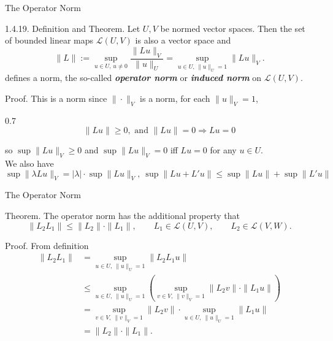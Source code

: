 \documentclass[hyperref={pdfpagelabels=true}]{beamer}
\newcommand{\highlightg}[1]{\textcolor[rgb]{0.1,0.5,0.3}{\emph{\textbf{#1}}}}
\newcommand{\<}{\langle}
\renewcommand{\>}{\rangle}
\newenvironment{shrinkeq}[1]%
{ \bgroup
  \addtolength\abovedisplayshortskip{#1}
  \addtolength\abovedisplayskip{#1}
  \addtolength\belowdisplayshortskip{#1}
  \addtolength\belowdisplayskip{#1}}
{\egroup\ignorespacesafterend}
\begin{document}
\begin{frame}{The Operator Norm}
    \begin{block}{1.4.19. Definition and Theorem.}
        Let $U,V$ be normed vector spaces. Then the set of bounded linear maps $\mathcal{L}(U,V)$ is also a vector space and 
        \[\|L\|:=\sup_{u \in U,\,u \neq 0}\frac{\|Lu\|_{V}}{\|u\|_{U}} = 
        \sup_{u \in U,\,\|u\|_{U} = 1}\|Lu\|_{V}.\]
        defines a norm, the so-called \highlightg{operator norm} or \highlightg{induced norm} on $\mathcal{L}(U,V)$.
    \end{block}
    \begin{block}{Proof.}
        This is a norm since $\|\cdot\|_{V}$ is a norm, for each $\|u\|_{V} = 1$,
        \begin{spacing}{0.7}
        \[\|Lu\| \geq 0, \text{ and }\|Lu\| = 0 \Rightarrow Lu = 0\]
        \end{spacing}
        so $\sup\|Lu\|_{V} \geq 0$ and $\sup\|Lu\|_{V} = 0$ iff $Lu = 0$ for any $u \in U$.\\
        We also have
        \begin{shrinkeq}{-2ex}
        \[
            \sup\|\lambda Lu\|_{V} = |\lambda| \cdot \sup\|Lu\|_{V},\ 
            \sup\|Lu+L'u\| \leq \sup\|Lu\|+\sup\|L'u\|
        \]
        \end{shrinkeq}
    \end{block}
\end{frame}
\begin{frame}{The Operator Norm}
    \begin{block}{Theorem.}
        The operator norm has the additional property that
        \[\|L_{2}L_{1}\| \leq \|L_{2}\| \cdot \|L_{1}\|, \qquad L_{1} \in \mathcal{L}(U,V), \qquad L_{2}\in \mathcal{L}(V,W).\]
    \end{block}
    \begin{block}{Proof.}
        From definition
        \[
            \begin{aligned}
                \|L_{2}L_{1}\| 
                &= \sup_{u \in U,\ \|u\|_{U} = 1}\|L_{2}L_{1}u\|\\
                &\leq \sup_{u \in U,\ \|u\|_{U} = 1}\left(\sup_{v \in V,\ \|v\|_{V} = 1}\|L_{2}v\| \cdot \|L_{1}u\|\right)\\
                &= \sup_{v \in V,\ \|v\|_{V} = 1}\|L_{2}v\| \cdot \sup_{u \in U,\ \|u\|_{U} = 1} \|L_{1}u\|\\
                &= \|L_{2}\|\cdot\|L_{1}\|.
            \end{aligned}
        \]
    \end{block}
\end{frame}
\end{document}
